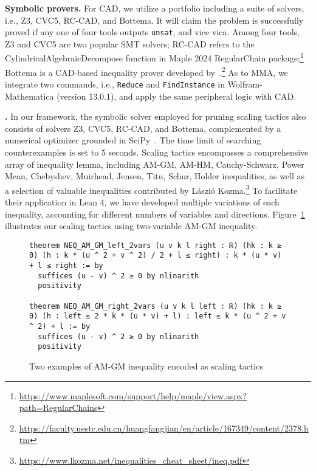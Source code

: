 \textbf{Symbolic provers. } For CAD, we utilize a portfolio including a suite of solvers, i.e., Z3, CVC5, RC-CAD, and Bottema. It will claim the problem is successfully proved if any one of four tools outputs \texttt{unsat}, and vice vica. 
Among four tools, Z3 and CVC5 are two popular SMT solvers;
RC-CAD refers to the CylindricalAlgebraicDecompose function in Maple 2024 RegularChain package;\footnote{\scriptsize\url{https://www.maplesoft.com/support/help/maple/view.aspx?path=RegularChains}}
Bottema is a CAD-based inequality prover developed by~\citet{yang1999recent}.\footnote{\scriptsize\url{https://faculty.uestc.edu.cn/huangfangjian/en/article/167349/content/2378.htm}} 
As to MMA, we integrate two commands, i.e., \texttt{Reduce} and \texttt{FindInstance} in Wolfram-Mathematica (version 13.0.1), and apply the same peripheral logic with CAD.

\textbf{\name. } In our framework, the symbolic solver employed for pruning scaling tactics also consists of solvers Z3, CVC5, RC-CAD, and Bottema, complemented by a numerical optimizer grounded in SciPy~\citep{virtanen2020scipy}. 
The time limit of searching counterexamples is set to 5 seconds. 
Scaling tactics encompasses a comprehensive array of inequality lemma, including AM-GM, AM-HM, Cauchy-Schwarz, Power Mean, Chebyshev, Muirhead, Jensen, Titu, Schur, Holder inequalities, as well as a selection of valuable inequalities contributed by L\'{a}szi\'{o} Kozma.\footnote{\scriptsize\url{https://www.lkozma.net/inequalities_cheat_sheet/ineq.pdf}}
To facilitate their application in Lean 4, we have developed multiple variations of each inequality, accounting for different numbers of variables and directions.
Figure~\ref{fig:scaling_tactic} illustrates our scaling tactics using two-variable AM-GM inequality.

\begin{figure}[ht]
{\small
\begin{lstlisting}
theorem NEQ_AM_GM_left_2vars (u v k l right : ℝ) (hk : k ≥ 0) (h : k * (u ^ 2 + v ^ 2) / 2 + l ≤ right) : k * (u * v) + l ≤ right := by
  suffices (u - v) ^ 2 ≥ 0 by nlinarith
  positivity

theorem NEQ_AM_GM_right_2vars (u v k l left : ℝ) (hk : k ≥ 0) (h : left ≤ 2 * k * (u * v) + l) : left ≤ k * (u ^ 2 + v ^ 2) + l := by
  suffices (u - v) ^ 2 ≥ 0 by nlinarith
  positivity
\end{lstlisting}
}
\vspace{-0.75em}
\caption{Two examples of AM-GM inequality encoded as scaling tactics}
\label{fig:scaling_tactic}
\end{figure}

